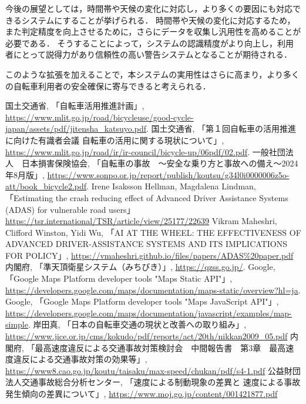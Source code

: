 \documentclass[uplatex,dvipdfmx]{jsarticle}
\begin{document}
今後の展望としては，時間帯や天候の変化に対応し，より多くの要因にも対応できるシステムにすることが挙げられる．
時間帯や天候の変化に対応するため，また判定精度を向上させるために，さらにデータを収集し汎用性を高めることが必要である．
そうすることによって，システムの認識精度がより向上し，利用者にとって説得力があり信頼性の高い警告システムとなることが期待される．

このような拡張を加えることで，本システムの実用性はさらに高まり，より多くの自転車利用者の安全確保に寄与できると考えられる．

\begin{thebibliography}{16}
 国土交通省, 「自転車活用推進計画」, \url{https://www.mlit.go.jp/road/bicycleuse/good-cycle-japan/assets/pdf/jitensha_katsuyo.pdf}.
  国土交通省, 「第１回自転車の活用推進に向けた有識者会議 自転車の活用に関する現状について」, \url{https://www.mlit.go.jp/road/ir/ir-council/bicycle-up/06pdf/02.pdf}.
 一般社団法人　日本損害保険協会, 「自転車の事故　〜安全な乗り方と事故への備え〜2024年8月版」, \url{https://www.sonpo.or.jp/report/publish/koutsu/g34l0i0000006z5o-att/book_bicycle2.pdf}.
 Irene Isaksson Hellman, Magdalena Lindman, 「Estimating the crash reducing effect of Advanced Driver Assistance Systems (ADAS) for vulnerable road users」\url{https://tsr.international/TSR/article/view/25177/22639}
 Vikram Maheshri, Clifford Winston, Yidi Wu, 「AI AT THE WHEEL:
THE EFFECTIVENESS OF ADVANCED DRIVER-ASSISTANCE SYSTEMS AND ITS IMPLICATIONS FOR POLICY」, \url{https://vmaheshri.github.io/files/papers/ADAS%20paper.pdf}
 内閣府, 「準天頂衛星システム（みちびき）」, \url{https://qzss.go.jp/}.
 Google, 「Google Maps Platform developer tools "Maps Static API"」, \url{https://developers.google.com/maps/documentation/maps-static/overview?hl=ja}.
 Google, 「Google Maps Platform developer tools "Maps JavaScript API"」, \url{https://developers.google.com/maps/documentation/javascript/examples/map-simple}.
 岸田真, 「日本の自転車交通の現状と改善への取り組み」, \url{https://www.jice.or.jp/cms/kokudo/pdf/reports/act/20th/nikkan2009_05.pdf}
 内閣府, 「最高速度違反による交通事故対策検討会　中間報告書　第3章　最高速度違反による交通事故対策の効果等」, \url{https://www8.cao.go.jp/koutu/taisaku/max-speed/chukan/pdf/s4-1.pdf}
 公益財団法人交通事故総合分析センター, 「速度による制動現象の差異と
速度による事故発生傾向の差異について」, \url{https://www.moj.go.jp/content/001421877.pdf}

\end{thebibliography}
\end{document}
